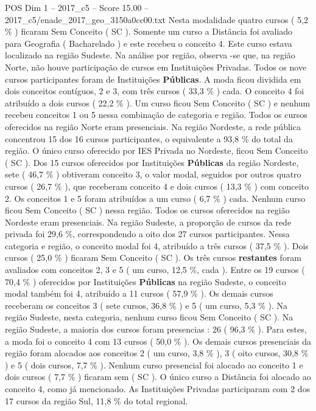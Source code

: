 \begin{textsample}{POS Dim 1 – 2017\_c5 – Score 15.00 – 2017\_c5/enade\_2017\_geo\_3150a0cc00.txt}
Nesta modalidade quatro cursos ( 5,2 \% ) ficaram Sem Conceito ( SC ).
Somente um curso a Distância foi avaliado para Geografia ( Bacharelado ) e este recebeu o conceito 4.
Este curso estava localizado na região Sudeste.
Na análise por região, observa -se que, na região Norte, não houve participação de cursos em Instituições Privadas.
Todos os nove cursos participantes foram de Instituições \textbf{Públicas}.
A moda ficou dividida em dois conceitos contíguos, 2 e 3, com três cursos ( 33,3 \% ) cada.
O conceito 4 foi atribuído a dois cursos ( 22,2 \% ).
Um curso ficou Sem Conceito ( SC ) e nenhum recebeu conceitos 1 ou 5 nessa combinação de categoria e região.
Todos os cursos oferecidos na região Norte eram presenciais.
Na região Nordeste, a rede pública concentrou 15 dos 16 cursos participantes, o equivalente a 93,8 \% do total da região.
O único curso oferecido por IES Privada no Nordeste, ficou Sem Conceito ( SC ).
Dos 15 cursos oferecidos por Instituições \textbf{Públicas} da região Nordeste, sete ( 46,7 \% ) obtiveram conceito 3, o valor modal, seguidos por outros quatro cursos ( 26,7 \% ), que receberam conceito 4 e dois cursos ( 13,3 \% ) com conceito 2.
Os conceitos 1 e 5 foram atribuídos a um curso ( 6,7 \% ) cada.
Nenhum curso ficou Sem Conceito ( SC ) nessa região.
Todos os cursos oferecidos na região Nordeste eram presenciais.
Na região Sudeste, a proporção de cursos da rede privada foi 29,6 \%, correspondendo a oito dos 27 cursos participantes.
Nessa categoria e região, o conceito modal foi 4, atribuído a três cursos ( 37,5 \% ).
Dois cursos ( 25,0 \% ) ficaram Sem Conceito ( SC ).
Os três cursos \textbf{restantes} foram avaliados com conceitos 2, 3 e 5 ( um curso, 12,5 \%, cada ).
Entre os 19 cursos ( 70,4 \% ) oferecidos por Instituições \textbf{Públicas} na região Sudeste, o conceito modal também foi 4, atribuído a 11 cursos ( 57,9 \% ).
Os demais cursos receberam os conceitos 3 ( sete cursos, 36,8 \% ) e 5 ( um curso, 5,3 \% ).
Na região Sudeste, nesta categoria, nenhum curso ficou Sem Conceito ( SC ).
Na região Sudeste, a maioria dos cursos foram presencias : 26 ( 96,3 \% ).
Para estes, a moda foi o conceito 4 com 13 cursos ( 50,0 \% ).
Os demais cursos presenciais da região foram alocados aos conceitos 2 ( um curso, 3,8 \% ), 3 ( oito cursos, 30,8 \% ) e 5 ( dois cursos, 7,7 \% ).
Nenhum curso presencial foi alocado ao conceito 1 e dois cursos ( 7,7 \% ) ficaram sem ( SC ).
O único curso a Distância foi alocado ao conceito 4, como já mencionado.
As Instituições Privadas participaram com 2 dos 17 cursos da região Sul, 11,8 \% do total regional.

\end{textsample}

